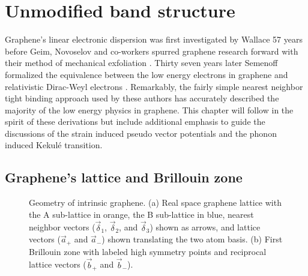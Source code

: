 \chapter{Unmodified band structure\label{chap:TB}}

Graphene's linear electronic dispersion was first investigated by Wallace \cite{Wallace1947} 57 years before Geim, Novoselov and co-workers spurred graphene research forward with their method of mechanical exfoliation \cite{Novoselov2004}.
Thirty seven years later Semenoff formalized the equivalence between the low energy electrons in graphene and relativistic Dirac-Weyl electrons \cite{Semenoff1984}.
Remarkably, the fairly simple nearest neighbor tight binding approach used by these authors has accurately described the majority of the low energy physics in graphene.
This chapter will follow in the spirit of these derivations but include additional emphasis to guide the discussions of the strain induced pseudo vector potentials and the phonon induced Kekul\'e transition.

\section{Graphene's lattice and Brillouin zone}
\begin{figure}
	\begin{center}
	
	\end{center}
	\caption[Geometry of intrinsic graphene.]{\label{fig:TB:geometry} Geometry of intrinsic graphene.  (a) Real space graphene lattice with the A sub-lattice in orange, the B sub-lattice in blue, nearest neighbor vectors ($\vec \delta_1$, $\vec \delta_2$, and $\vec \delta_3$) shown as arrows, and lattice vectors ($\vec a_+$ and $\vec a_-$) shown translating the two atom basis. (b) First Brillouin zone with labeled high symmetry points and reciprocal lattice vectors ($\vec{b}_+$ and $\vec{b}_-$).}
\end{figure}

